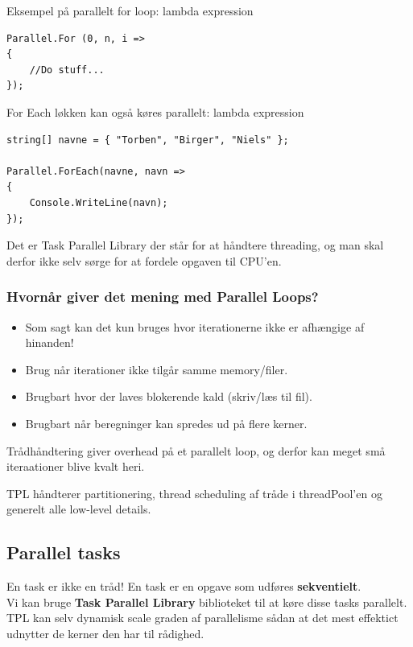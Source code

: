 Eksempel på parallelt for loop: lambda expression

\begin{lstlisting}[caption=Parallel for loop,  label=code:paraLoop,
morekeywords={Parallel, For}]
Parallel.For (0, n, i =>
{
	//Do stuff...
});
\end{lstlisting}

For Each løkken kan også køres parallelt: lambda expression

\begin{lstlisting}[caption=Parallelt for each loop, label=paraForEach,morekeywords={string,Parallel, ForEach, WriteLine}]
string[] navne = { "Torben", "Birger", "Niels" };

Parallel.ForEach(navne, navn =>
{
	Console.WriteLine(navn);
});
\end{lstlisting}

Det er Task Parallel Library der står for at håndtere threading, og man skal derfor ikke selv sørge for at fordele opgaven til CPU'en. 

\subsubsection{Hvornår giver det mening med Parallel Loops?}
\begin{itemize}
	\item Som sagt kan det kun bruges hvor iterationerne ikke er afhængige af hinanden!
	\item Brug når iterationer ikke tilgår samme memory/filer.
	\item Brugbart hvor der laves blokerende kald (skriv/læs til fil).
	\item Brugbart når beregninger kan spredes ud på flere kerner.
\end{itemize}

Trådhåndtering giver overhead på et parallelt loop, og derfor kan meget små iteraationer blive kvalt heri.

TPL håndterer partitionering, thread scheduling af tråde i threadPool'en og generelt alle low-level details.

\subsection{Parallel tasks}

En task er ikke en tråd! En task er en opgave som udføres \textbf{sekventielt}.\\

Vi kan bruge \textbf{Task Parallel Library} biblioteket til at køre disse tasks parallelt. TPL kan selv dynamisk scale graden af parallelisme sådan at det mest effektict udnytter de kerner den har til rådighed.

